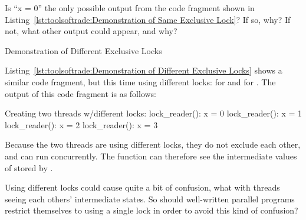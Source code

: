 \QuickQuiz{}
	Is ``x = 0'' the only possible output from the code fragment
	shown in
	Listing~\ref{lst:toolsoftrade:Demonstration of Same Exclusive Lock}?
	If so, why?
	If not, what other output could appear, and why?
 \QuickQuizEnd

\begin{listing}[tbp]

\caption{Demonstration of Different Exclusive Locks}
\label{lst:toolsoftrade:Demonstration of Different Exclusive Locks}
\end{listing}

Listing~\ref{lst:toolsoftrade:Demonstration of Different Exclusive Locks}
shows a similar code fragment, but this time using different locks:
 for  and  for
.
The output of this code fragment is as follows:

\begin{VerbatimU}
Creating two threads w/different locks:
lock_reader(): x = 0
lock_reader(): x = 1
lock_reader(): x = 2
lock_reader(): x = 3
\end{VerbatimU}

Because the two threads are using different locks, they do not exclude
each other, and can run concurrently.
The  function can therefore see the intermediate
values of  stored by .

\QuickQuiz{}
	Using different locks could cause quite a bit of confusion,
	what with threads seeing each others' intermediate states.
	So should well-written parallel programs restrict themselves
	to using a single lock in order to avoid this kind of confusion?
 \QuickQuizEnd

